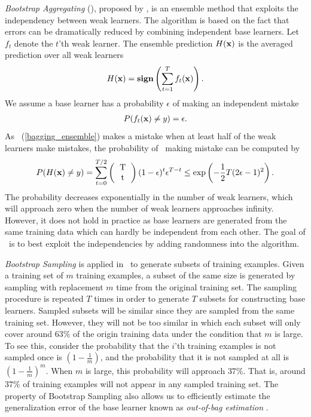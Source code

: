 {\textit{Bootstrap Aggregating} (\bagging), proposed by \citet{Breiman96bagging}, is an ensemble method that exploits the independency between weak learners.
The algorithm is based on the fact that errors can be dramatically reduced by combining independent base learners.
Let $f_t$ denote the $t$'th weak learner.
The ensemble prediction $H(\mathbf {x})$ is the averaged prediction over all weak learners
\begin{align}
	H(\mathbf {x}) = \textbf{sign}\left(\sum_{t=1}^{T}f_t(\mathbf {x})\right). \label{bagging_ensemble}
\end{align}
We assume a base learner has a probability $\epsilon$ of making an independent mistake
\begin{align*}
	P(f_t(\mathbf {x}) \ne y) = \epsilon.
\end{align*}
As \bagging\ (\ref{bagging_ensemble}) makes a mistake when at least half of the weak learners make mistakes, the probability of \bagging\ making mistake can be computed by
\begin{align*}
	P(H(\vx)\neq y) = \sum_{t=0}^{T/2}\left(\begin{tabular}{cc}T\\t\end{tabular}\right)(1-\epsilon)^t\epsilon^{T-t} \le\exp\left(-\frac{1}{2}T(2\epsilon-1)^2\right).
\end{align*}
The probability decreases exponentially in the number of weak learners, which will approach zero when the number of weak learners approaches infinity.
However, it does not hold in practice as base learners are generated from the same training data which can hardly be independent from each other.
The goal of \bagging\ is to best exploit the independencies by adding randomness into the algorithm.

\textit{Bootstrap Sampling} \citep{Efron1994introduction} is applied in \bagging\ to generate subsets of training examples.
Given a training set of $m$ training examples, a subset of the same size is generated by sampling with replacement $m$ time from the original training set.
The sampling procedure is repeated $T$ times in order to generate $T$ subsets for constructing base learners.
Sampled subsets will be similar since they are sampled from the same training set.
However, they will not be too similar in which each subset will only cover around $63\%$ of the origin training data under the condition that $m$ is large.
To see this, consider the probability that the $i$'th training examples is not sampled once is $(1-\frac{1}{m})$, and the probability that it is not sampled at all is $(1-\frac{1}{m})^m$.
When $m$ is large, this probability will approach $37\%$. 
That is, around $37\%$ of training examples will not appear in any sampled training set.
The property of Bootstrap Sampling also allows us to efficiently estimate the generalization error of the base learner known as \textit{out-of-bag estimation} \citep{Breiman96out,Tibshirani1996bias,Wolpert99an}.

}
